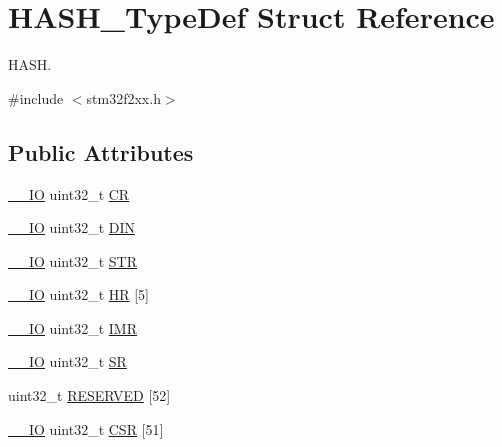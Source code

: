 \hypertarget{struct_h_a_s_h___type_def}{\section{H\-A\-S\-H\-\_\-\-Type\-Def Struct Reference}
\label{struct_h_a_s_h___type_def}
}


H\-A\-S\-H.  




{\ttfamily \#include $<$stm32f2xx.\-h$>$}

\subsection*{Public Attributes}
\begin{DoxyCompactItemize}
\item 
\hyperlink{group___c_m_s_i_s__core__definitions_gaec43007d9998a0a0e01faede4133d6be}{\-\_\-\-\_\-\-I\-O} uint32\-\_\-t \hyperlink{struct_h_a_s_h___type_def_adba940f3265121b77f9304b1843010ea}{C\-R}
\item 
\hyperlink{group___c_m_s_i_s__core__definitions_gaec43007d9998a0a0e01faede4133d6be}{\-\_\-\-\_\-\-I\-O} uint32\-\_\-t \hyperlink{struct_h_a_s_h___type_def_ac4f283960465f7a1d318ed66d4b88f74}{D\-I\-N}
\item 
\hyperlink{group___c_m_s_i_s__core__definitions_gaec43007d9998a0a0e01faede4133d6be}{\-\_\-\-\_\-\-I\-O} uint32\-\_\-t \hyperlink{struct_h_a_s_h___type_def_a4b07bc8eb36129062d3f331921316d66}{S\-T\-R}
\item 
\hyperlink{group___c_m_s_i_s__core__definitions_gaec43007d9998a0a0e01faede4133d6be}{\-\_\-\-\_\-\-I\-O} uint32\-\_\-t \hyperlink{struct_h_a_s_h___type_def_a4788d8786be90fd9e71fbd8a5e03a115}{H\-R} \mbox{[}5\mbox{]}
\item 
\hyperlink{group___c_m_s_i_s__core__definitions_gaec43007d9998a0a0e01faede4133d6be}{\-\_\-\-\_\-\-I\-O} uint32\-\_\-t \hyperlink{struct_h_a_s_h___type_def_a01011d00eb28b8798af8c5dfedf6f35d}{I\-M\-R}
\item 
\hyperlink{group___c_m_s_i_s__core__definitions_gaec43007d9998a0a0e01faede4133d6be}{\-\_\-\-\_\-\-I\-O} uint32\-\_\-t \hyperlink{struct_h_a_s_h___type_def_a8af8c27ac134cbeb13af4e4e856de537}{S\-R}
\item 
uint32\-\_\-t \hyperlink{struct_h_a_s_h___type_def_aec9dbfd897829b3af5b672984924eed4}{R\-E\-S\-E\-R\-V\-E\-D} \mbox{[}52\mbox{]}
\item 
\hyperlink{group___c_m_s_i_s__core__definitions_gaec43007d9998a0a0e01faede4133d6be}{\-\_\-\-\_\-\-I\-O} uint32\-\_\-t \hyperlink{struct_h_a_s_h___type_def_a6d9958409436502910d446daa32dedf5}{C\-S\-R} \mbox{[}51\mbox{]}
\end{DoxyCompactItemize}


